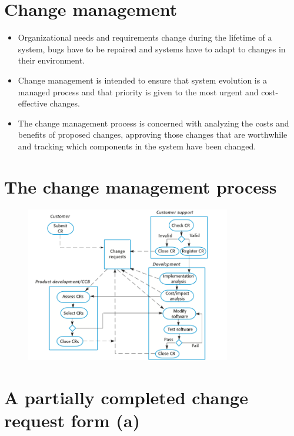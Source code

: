 \section{Change management}
\begin{itemize}

\item Organizational needs and requirements change during the lifetime of a system, bugs have to be repaired and systems have to adapt to changes in their environment.

\item Change management is intended to ensure that system evolution is a managed process and that priority is given to the most urgent and cost-effective changes.

\item The change management process is concerned with analyzing the costs and benefits of proposed changes, approving those changes that are worthwhile and tracking which components in the system have been changed.

\end{itemize}
\section{The change management process}
\begin{figure}[h!]
    \centering
    \includegraphics[width = 0.8\textwidth]{./figures/L8_2.png}
    \caption{}
    \label{fig:L8_2}
\end{figure}


\section{A partially completed change request form (a)}


